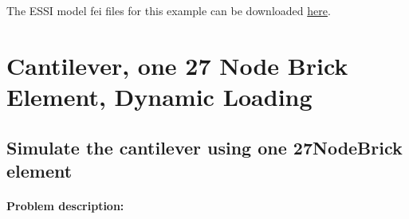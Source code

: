 \documentclass[fleqn,11pt]{article}
\begin{document}
The    ESSI   model   fei   files   for   this   example   can   be   downloaded
\href{https://github.com/BorisJeremic/Real-ESSI-Examples/blob/master/model_fei_file/beam_elastic_5element_dynamic/beam_elastic_5element_dynamic.tgz?raw=true}{here}.























\newpage
\section{Cantilever, one 27 Node Brick Element, Dynamic Loading} 



\subsection{Simulate the cantilever using one 27NodeBrick element} 





\paragraph{Problem description:} 
\end{document}
